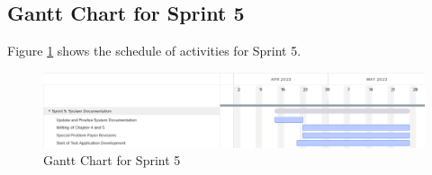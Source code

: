\subsection{Gantt Chart for Sprint 5}
\label{subsec:gantt_chart_sprint5}
Figure \ref{fig:gantt_chart_sprint5} shows the schedule of activities for Sprint 5. 
\begin{figure}[ht]
    \centering
    \includegraphics[width=1\textwidth]{./assets/Chapter_3/Gantt/Gantt_Chart_Sprint5.png}
    \caption{Gantt Chart for Sprint 5}
    \label{fig:gantt_chart_sprint5}
\end{figure}
\FloatBarrier